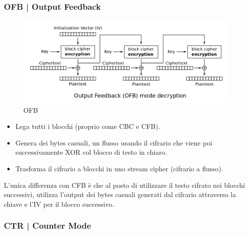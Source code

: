 
\subsubsection{OFB | Output Feedback}

\begin{figure}[H]
	\centering
	\includegraphics[width=1\textwidth, height=1\textheight, keepaspectratio]{./images/aes_modes/ofb.png} %
	\caption{OFB}
	\label{fig:ofb}
\end{figure}


\textsf{\small }

\textsf{\small }%

\begin{itemize}
	\item \textsf{\small Lega tutti i blocchi (proprio come CBC e CFB).}
	\item \textsf{\small Genera dei bytes casuali, un flusso usando il cifrario che viene poi successivamente XOR col blocco di testo in chiaro.}
	\item \textsf{\small Trasforma il cifrario a blocchi in uno stream cipher (cifrario a flusso).}
\end{itemize}

\textsf{\small L'unica differenza con CFB è che al posto di utilizzare il testo cifrato nei blocchi successivi, utilizza l'output dei bytes casuali generati dal cifrario attraverso la chiave e l'IV per il blocco successivo.}

\subsubsection{CTR | Counter Mode}

